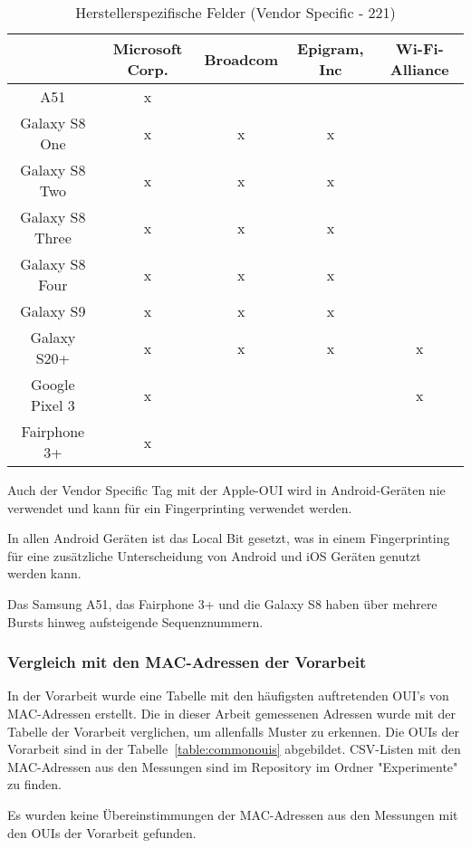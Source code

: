 \clearpage

\begin{table}[h!]
    \centering
    \begin{tabular}{|c|c|c|c|c|}
        \hline
          & \textbf{Microsoft Corp.} & \textbf{Broadcom} & \textbf{Epigram, Inc} & \textbf{Wi-Fi-Alliance}\\
        \hline 
        A51 & x & & & \\
        Galaxy S8 One & x & x & x & \\
        Galaxy S8 Two & x & x & x & \\
        Galaxy S8 Three & x & x & x & \\
        Galaxy S8 Four & x & x & x & \\
        Galaxy S9 & x & x & x &  \\
        Galaxy S20+ & x & x & x & x \\
        Google Pixel 3 & x & & & x \\
        Fairphone 3+ & x & & & \\ 
        \hline
    \end{tabular}
    \caption{Herstellerspezifische Felder (Vendor Specific - 221)
    \label{table:androidvendorspecificiefields}}  
\end{table}
Auch der Vendor Specific Tag mit der Apple-OUI wird in Android-Geräten nie verwendet
und kann für ein Fingerprinting verwendet werden.

In allen Android Geräten ist das Local Bit gesetzt, was in einem Fingerprinting für eine
zusätzliche Unterscheidung von Android und iOS Geräten genutzt werden kann.

Das Samsung A51, das Fairphone 3+ und die Galaxy S8 haben über mehrere Bursts 
hinweg aufsteigende Sequenznummern.

\subsubsection*{Vergleich mit den MAC-Adressen der Vorarbeit}
In der Vorarbeit wurde eine Tabelle mit den häufigsten auftretenden OUI's von
MAC-Adressen erstellt. Die in dieser Arbeit gemessenen Adressen wurde mit der
Tabelle der Vorarbeit verglichen, um allenfalls Muster zu erkennen. 
Die OUIs der Vorarbeit sind in der Tabelle~\ref{table:commonouis} abgebildet.
CSV-Listen mit den MAC-Adressen aus den Messungen sind im Repository im 
Ordner "Experimente" zu finden.

Es wurden keine Übereinstimmungen der MAC-Adressen aus den Messungen mit den 
OUIs der Vorarbeit gefunden.

\clearpage